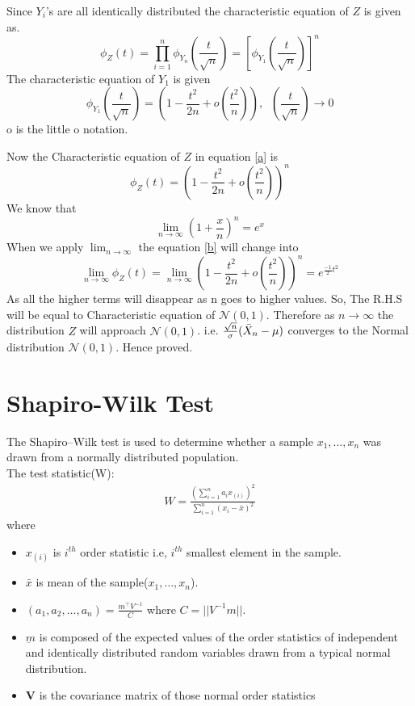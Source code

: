 \documentclass{article}
\begin{document}
Since $Y_i$'s are all identically distributed the characteristic equation of $Z$ is given as.
\begin{equation}
    \phi_{Z}(t) =\displaystyle \prod_{i=1}^n\phi_{Y_n}\left(\frac{t}{\sqrt{n}}\right) = \left[\phi_{Y_1}\left(\frac{t}{\sqrt{n}}\right)\right]^n
\end{equation}
The characteristic equation of $Y_1$ is given
\begin{equation}
    \phi_{Y_1}\left(\frac{t}{\sqrt{n}}\right) = \left(1-\frac{t^2}{2n} + o\left(\frac{t^2}{n}\right)\right), \;\; \left(\frac{t}{\sqrt{n}}\right)\to 0 \label{b}
\end{equation}
o is the little o notation.

Now the Characteristic equation of $Z$ in equation \eqref{a} is 
\begin{equation}
    \phi_{Z}(t) = \left( 1-\frac{t^2}{2n} + o\left(\frac{t^2}{n}\right) \right)^n
\end{equation}
We know that 
$$\lim_{n\to\infty} \left(1+\frac{x}{n}\right)^n = e^x$$
When we apply $\lim_{n\to\infty}$ the equation \eqref{b} will change into 
\begin{equation}
    \lim_{n\to\infty}\phi_{Z}(t) =\lim_{n\to\infty}\left( 1-\frac{t^2}{2n} + o\left(\frac{t^2}{n}\right) \right)^n =  e^{\frac{-1}{2}t^2}
\end{equation}
As all the higher terms will disappear as n goes to higher values.
So, The R.H.S will be equal to Characteristic equation of $\mathcal{N}(0,1)$.
Therefore as $n\to\infty$ the distribution $Z$ will approach $\mathcal{N}(0,1)$.
i.e. $\frac{\sqrt{n}}{\sigma}(\Bar{X}_n - \mu) $ converges to the Normal distribution $\mathcal{N}(0,1)$.
Hence proved.

\section{Shapiro-Wilk Test}
The Shapiro–Wilk test is used to determine whether a sample $x_{1},..., x_{n}$ was drawn from a normally distributed population.\\
The test statistic(W):
\begin{align}
    W=\frac{\left(\displaystyle\sum_{i=1}^{n}a_{i}x_{(i)}\right)^{2}}{\displaystyle\sum_{i=1}^{n}(x_{i}-\bar{x})^{2}}
\end{align}
where
\begin{itemize}
    \item $x_{(i)}$ is $i^{th}$ order statistic i.e, $i^{th}$ smallest element in the sample.
    \item $\bar{x}$ is mean of the sample($x_{1},\dots,x_{n}$). 
    \item $(a_{1},a_{2},\dots,a_{n})=\frac{m^{\top}V^{-1}}{C}$ where $C=||V^{-1}m||$.
    \item $\underbar{m}$ is composed of the expected values of the order statistics of independent and identically distributed random variables drawn from a typical normal distribution.
    \item $\mathbf{V}$ is the covariance matrix of those normal order statistics
\end{itemize}
\end{document}
